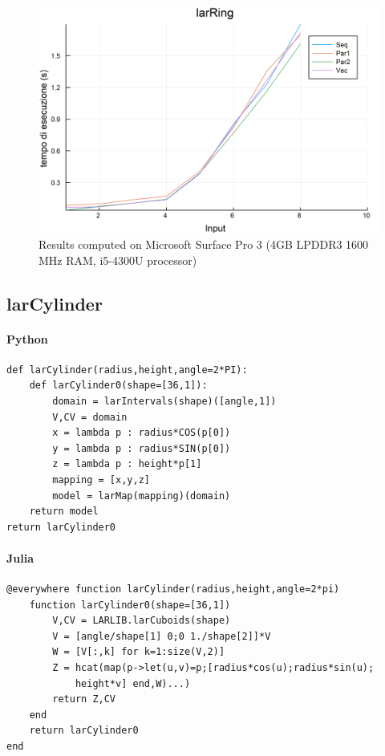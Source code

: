 \documentclass{article}
\begin{document}
\begin{figure}[htbp] 
\centering 
\includegraphics[scale=.13]{larRingTime.png} 
\caption{Results computed on Microsoft Surface Pro  3 (4GB LPDDR3 1600 MHz RAM, i5-4300U processor)} 
\end{figure}
\subsection{larCylinder}

\paragraph{Python}

\begin{verbatim}
def larCylinder(radius,height,angle=2*PI):
    def larCylinder0(shape=[36,1]):
        domain = larIntervals(shape)([angle,1])
        V,CV = domain
        x = lambda p : radius*COS(p[0])
        y = lambda p : radius*SIN(p[0])
        z = lambda p : height*p[1]
        mapping = [x,y,z]
        model = larMap(mapping)(domain)
    return model
return larCylinder0
\end{verbatim}

\paragraph{Julia}

\begin{verbatim}
@everywhere function larCylinder(radius,height,angle=2*pi)
    function larCylinder0(shape=[36,1])
        V,CV = LARLIB.larCuboids(shape)
        V = [angle/shape[1] 0;0 1./shape[2]]*V
        W = [V[:,k] for k=1:size(V,2)]
        Z = hcat(map(p->let(u,v)=p;[radius*cos(u);radius*sin(u);
        	height*v] end,W)...)
        return Z,CV
    end
    return larCylinder0
end
\end{verbatim}
\end{document}
